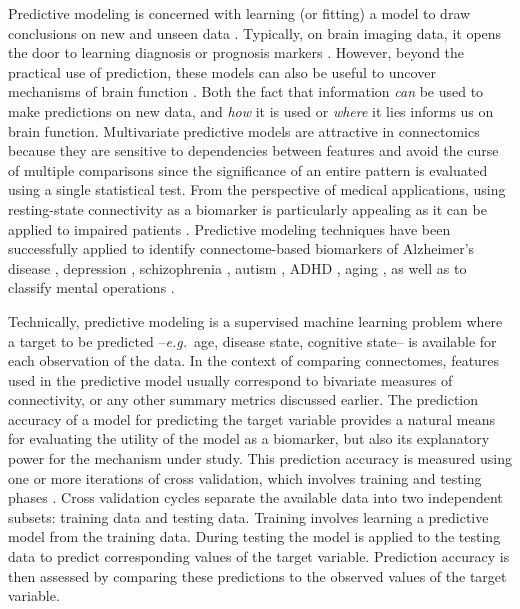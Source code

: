 \documentclass[5p]{elsarticle}
\begin{document}
Predictive modeling is concerned with learning (or fitting) a model to
draw conclusions on new and unseen data \cite{pereira2009}. Typically, on
brain imaging data, it opens the door to learning diagnosis or prognosis
markers \cite{stonnington2010}. However, beyond the practical use of
prediction, these models can also be useful to uncover mechanisms of brain
function \cite{norman2006}. Both the fact that information \emph{can} be
used to make predictions on new data, and \emph{how} it is used or
\emph{where} it lies informs us on brain function. Multivariate
predictive models
are attractive in connectomics because they are sensitive to dependencies
between features and avoid the curse of multiple comparisons
since the significance of an entire pattern is evaluated using a single
statistical test. From the perspective of medical applications, using
resting-state connectivity as a biomarker is particularly appealing as it
can be applied to impaired patients \cite{greicius2008b}. Predictive
modeling techniques have been successfully applied to identify
connectome-based biomarkers of Alzheimer's disease
\cite{stonnington2010}, depression \cite{craddock2009}, schizophrenia
\cite{cecchi2009}, autism \cite{anderson2011}, ADHD \cite{zhu2008}, aging
\cite{dosenbach2010}, as well as to classify mental operations
\cite{richiardi2011,shirer2012}.


Technically, predictive modeling is a supervised machine learning problem
where a target to be predicted --\emph{e.g.}\ age, disease state,
cognitive state-- is available for each observation of the data. In the
context of comparing connectomes, features used in the predictive model
usually correspond to bivariate measures of connectivity, or any other
summary metrics discussed earlier.
%
The prediction accuracy of a model for predicting the target variable
provides a natural means for evaluating the utility of the model as a
biomarker, but also its explanatory power for the mechanism under study.
%
This prediction accuracy is measured using one or more iterations of
cross validation, which involves training and testing phases
\cite{pereira2009}. Cross validation cycles separate the
available data into two independent subsets: training data and testing
data.  Training involves learning a predictive model from the training
data. During testing the model is applied to the testing data to predict
corresponding values of the target variable.  Prediction accuracy is then
assessed by comparing these predictions to the observed values of the
target variable.
\end{document}
